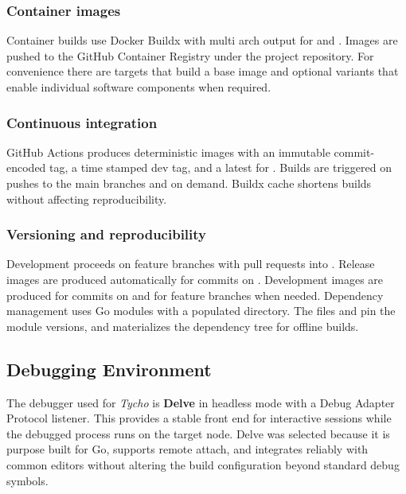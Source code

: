 \subsubsection{Container images}
\label{subsec:tycho_sysenv_build_images}
Container builds use Docker Buildx with multi arch output for  and . Images are pushed to the GitHub Container Registry under the project repository. For convenience there are targets that build a base image and optional variants that enable individual software components when required. 

\subsubsection{Continuous integration}
\label{subsec:tycho_sysenv_build_ci}
GitHub Actions produces deterministic images with an immutable commit-encoded tag, a time stamped dev tag, and a latest for . Builds are triggered on pushes to the main branches and on demand. Buildx cache shortens builds without affecting reproducibility.

\subsubsection{Versioning and reproducibility}
\label{subsec:tycho_sysenv_versioning}
Development proceeds on feature branches with pull requests into . Release images are produced automatically for commits on . Development images are produced for commits on  and for feature branches when needed. Dependency management uses Go modules with a populated  directory. The files  and  pin the module versions, and  materializes the dependency tree for offline builds. 

\subsection{Debugging Environment}
\label{sec:tycho_sysenv_debug}
The debugger used for \textit{Tycho} is \textbf{Delve} in headless mode with a Debug Adapter Protocol listener. This provides a stable front end for interactive sessions while the debugged process runs on the target node. Delve was selected because it is purpose built for Go, supports remote attach, and integrates reliably with common editors without altering the build configuration beyond standard debug symbols.

